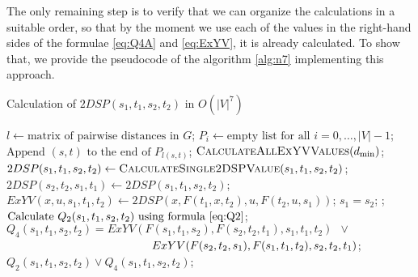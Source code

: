The only remaining step is to verify that we can organize the calculations in a suitable order, so that by the moment we use each of the values in the right-hand sides of the formulae \eqref{eq:Q4A} and \eqref{eq:ExYV}, it is already calculated. To show that, we provide the pseudocode of the algorithm \ref{alg:n7} implementing this approach.

\begin{algorithm}
\caption{Calculation of $2DSP(s_1, t_1, s_2, t_2)$ in $O(|V|^7)$} \label{alg:n7}
\begin{algorithmic}[1]
\State $l \gets \text{matrix of pairwise distances in }G$;
\State $P_i \gets \text{empty list for all }i = 0, \ldots, |V|-1$;
    \State $\text{Append }(s, t)\text{ to the end of }P_{l(s, t)}$;
\EndFor
{}
    \State $\textsc{CalculateAllExYVValues}(d_{\min})$; \label{line:calcExYV}
                \State $2DSP(s_1, t_1, s_2, t_2) \gets \textsc{CalculateSingle2DSPValue}(s_1, t_1, s_2, t_2)$;
                \State $2DSP(s_2, t_2, s_1, t_1) \gets 2DSP(s_1, t_1, s_2, t_2)$; 
            \EndFor
        \EndFor
    \EndFor
\EndFor
\EndProcedure
\Statex
{}
                \State $ExYV(x,u,s_1,t_1,t_2) \gets 2DSP(x, F(t_1,x,t_2), u, F(t_2,u,s_1))$;
            \EndFor
        \EndFor
    \EndFor
\EndProcedure
\Statex
{}
    \State \Return $s_1 = s_2$; 
    \State {};
\Else
    \State $\text{Calculate }Q_2(s_1, t_1, s_2, t_2)\text{ using formula \eqref{eq:Q2}}$; 
    \State $Q_4(s_1, t_1, s_2, t_2) = ExYV(F(s_1, t_1, s_2), F(s_2, t_2, t_1), s_1, t_1, t_2)\enspace\vee\enspace$ 
    \Statex $\hspace{4.5cm}ExYV(F(s_2, t_2, s_1), F(s_1, t_1, t_2), s_2, t_2, t_1)$; \label{line:useExYV}
    \State \Return $Q_2(s_1, t_1, s_2, t_2) \vee Q_4(s_1, t_1, s_2, t_2)$;
\EndIf
\EndProcedure
\end{algorithmic}
\end{algorithm}

